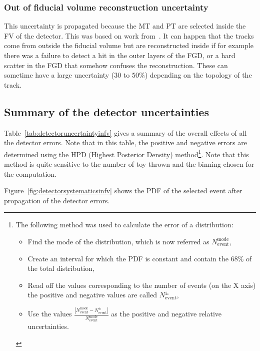 \subsubsection{Out of fiducial volume reconstruction uncertainty}
\label{subsec:recooofv}
This uncertainty is propagated because the \Gls{MT} and \Gls{PT} are
selected inside the \Gls{FV} of the detector. This was based on work
from~\cite{TN098}. It can happen that the tracks come from outside the
fiducial volume but are reconstructed inside if for example there was
a failure to detect a hit in the outer layers of the \Gls{FGD}, or a
hard scatter in the \Gls{FGD} that somehow confuses the
reconstruction. These can sometime have a large uncertainty ($30$ to
$50\%$) depending on the topology of the track.


\subsection{Summary of the detector uncertainties}
\label{subsec:detsystsummary}

Table~\ref{tab:detectoruncertaintyinfv} gives a summary of the overall
effects of all the detector errors. Note that in this table, the
positive and negative errors are determined using the \Gls{HPD}
(Highest Posterior Density) method\footnote{The following method was
  used to calculate the error of a distribution:
  \begin{itemize}[noitemsep,topsep=0pt]
  \item Find the mode of the distribution, which is now referred as
    $N_\text{event}^\text{mode}$,
  \item Create an interval for which the \Gls{PDF} is constant and
    contain the $68\%$ of the total distribution,
  \item Read off the values corresponding to the number of events (on
    the X axis) the positive and negative values are called
    $N_\text{event}^{\pm}$,
  \item Use the values
    $\frac{\left|N_\text{event}^\text{mode} -
        N_\text{event}^\pm\right|}{N_\text{event}^\text{mode}}$ as the
    positive and negative relative uncertainties. \label{ftn:hpd}
  \end{itemize}
}. Note that this method is quite sensitive to the number of toy
thrown and the binning chosen for the computation.

Figure~\ref{fig:detectorsystematicsinfv} shows the \Gls{PDF} of the
selected event after propagation of the detector errors.

